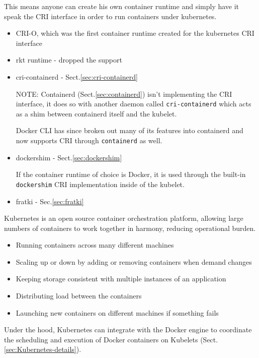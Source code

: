 This means anyone can create his own container runtime and simply have it speak
the CRI interface in order to run containers under kubernetes.
\begin{itemize}
  
  \item CRI-O, which was the first container runtime created for the kubernetes
  CRI interface
  
  \item rkt runtime - dropped the support
  
  \item cri-containerd - Sect.\ref{sec:cri-containerd}
  
  NOTE: Containerd (Sect.\ref{sec:containerd}) isn’t implementing the CRI
  interface, it does so with another daemon called \verb!cri-containerd! which acts as
  a shim between containerd itself and the kubelet.

  Docker CLI has since broken out many of its features into containerd and now
  supports CRI through \verb!containerd! as well.
  
  \item dockershim - Sect.\ref{sec:dockershim}
  
If the container runtime of choice is Docker, it is used through the built-in
\verb!dockershim! CRI implementation inside of the kubelet.

  \item fratki - Sec.\ref{sec:fratki}
\end{itemize}


Kubernetes is an open source container orchestration platform, allowing large
numbers of containers to work together in harmony, reducing operational burden.

\begin{itemize}
  \item   Running containers across many different machines
  \item   Scaling up or down by adding or removing containers when demand changes
  \item   Keeping storage consistent with multiple instances of an application
  \item   Distributing load between the containers
  \item   Launching new containers on different machines if something fails

\end{itemize}

Under the hood, Kubernetes can integrate with the Docker engine to coordinate
the scheduling and execution of Docker containers on Kubelets (Sect.\ref{sec:Kubernetes-details}).


